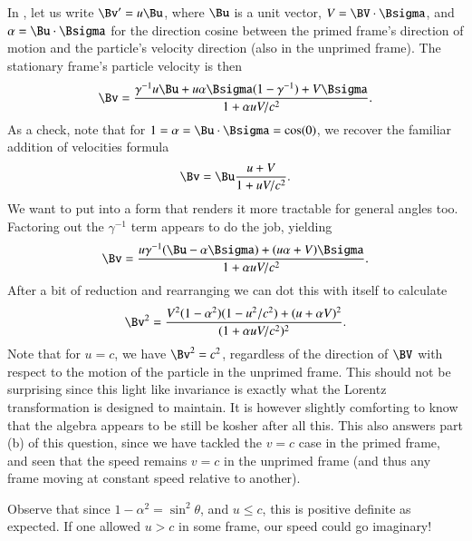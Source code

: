 {In , let us write \(\Bv' = u \Bu\), where \(\Bu\) is a unit vector, \(V = \BV \cdot \Bsigma\), and \(\alpha = \Bu \cdot \Bsigma\) for the direction cosine between the primed frame's direction of motion and the particle's velocity direction (also in the unprimed frame).  The stationary frame's particle velocity is then
%
\begin{equation}\label{eqn:relativisticElectrodynamicsA1:260}
\Bv = \frac{\gamma^{-1} u \Bu + u \alpha \Bsigma (1 - \gamma^{-1}) + V \Bsigma}{ 1 + \alpha u V/c^2 }.
\end{equation}
%
As a check, note that for \(1 = \alpha = \Bu \cdot \Bsigma = \cos(0)\), we recover the familiar addition of velocities formula
%
\begin{equation}\label{eqn:relativisticElectrodynamicsA1:260b}
\Bv = \Bu \frac{u + V}{ 1 + u V/c^2 }.
\end{equation}
%
We want to put  into a form that renders it more tractable for general angles too.  Factoring out the \(\gamma^{-1}\) term appears to do the job, yielding
%
\begin{equation}\label{eqn:relativisticElectrodynamicsA1:260c}
\Bv = \frac{u \gamma^{-1} (\Bu -\alpha \Bsigma) + (u \alpha + V) \Bsigma}{ 1 + \alpha u V/c^2 }.
\end{equation}
%
After a bit of reduction and rearranging we can dot this with itself to calculate
%
\begin{equation}\label{eqn:relativisticElectrodynamicsA1:270}
\Bv^2 = \frac{V^2(1 - \alpha^2)(1 - u^2/c^2) + (u + \alpha V)^2}{ (1 + \alpha u V/c^2)^2 }.
\end{equation}
%
Note that for \(u = c\), we have \(\Bv^2 = c^2\), regardless of the direction of \(\BV\) with respect to the motion of the particle in the unprimed frame.  This should not be surprising since this light like invariance is exactly what the Lorentz transformation is designed to maintain.  It is however slightly comforting to know that the algebra appears to be still be kosher after all this.  This also answers part (b) of this question, since we have tackled the \(v = c\) case in the primed frame, and seen that the speed remains \(v = c\) in the unprimed frame (and thus any frame moving at constant speed relative to another).

Observe that since \(1 - \alpha^2 = \sin^2\theta\), and \(u \le c\), this is positive definite as expected.  If one allowed \(u > c\) in some frame, our speed could go imaginary!

}
